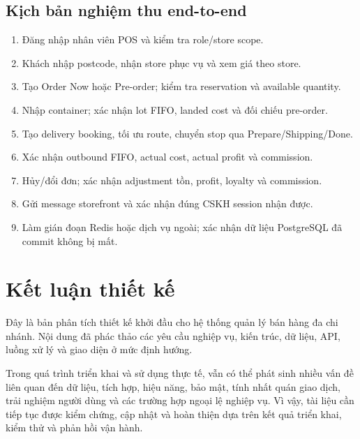 \documentclass[12pt,a4paper]{report}
\begin{document}
\section{Kịch bản nghiệm thu end-to-end}
\begin{enumerate}
  \item Đăng nhập nhân viên POS và kiểm tra role/store scope.
  \item Khách nhập postcode, nhận store phục vụ và xem giá theo store.
  \item Tạo Order Now hoặc Pre-order; kiểm tra reservation và available quantity.
  \item Nhập container; xác nhận lot FIFO, landed cost và đối chiếu pre-order.
  \item Tạo delivery booking, tối ưu route, chuyển stop qua Prepare/Shipping/Done.
  \item Xác nhận outbound FIFO, actual cost, actual profit và commission.
  \item Hủy/đổi đơn; xác nhận adjustment tồn, profit, loyalty và commission.
  \item Gửi message storefront và xác nhận đúng CSKH session nhận được.
  \item Làm gián đoạn Redis hoặc dịch vụ ngoài; xác nhận dữ liệu PostgreSQL đã commit không bị mất.
\end{enumerate}

\chapter{Kết luận thiết kế}
Đây là bản phân tích thiết kế khởi đầu cho hệ thống quản lý bán hàng đa chi nhánh. Nội dung đã phác thảo các yêu cầu nghiệp vụ, kiến trúc, dữ liệu, API, luồng xử lý và giao diện ở mức định hướng.

Trong quá trình triển khai và sử dụng thực tế, vẫn có thể phát sinh nhiều vấn đề liên quan đến dữ liệu, tích hợp, hiệu năng, bảo mật, tính nhất quán giao dịch, trải nghiệm người dùng và các trường hợp ngoại lệ nghiệp vụ. Vì vậy, tài liệu cần tiếp tục được kiểm chứng, cập nhật và hoàn thiện dựa trên kết quả triển khai, kiểm thử và phản hồi vận hành.
\end{document}
